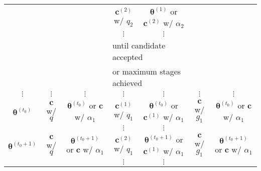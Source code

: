 \begin{sidewaystable}[h]
\begin{tabular}{|c||c|c||c|c||c|c|}
\cline{4-5}
                     &                         &                                         & $\mathbf{c}^{(2)}$ w/ $q_2$     & $\boldsymbol{\theta}^{(1)}$ or $\mathbf{c}^{(2)}$ w/ $\alpha_2$       &                  &                                         \\
\cline{4-5}
                     &                         &                                         & $\vdots$               & $\vdots$                                        &                  &                                         \\
\cline{4-5}
                     &                         &                                         & \multicolumn{2}{l||}{until candidate accepted}                           &                  &                                         \\
                     &                         &                                         & \multicolumn{2}{l||}{or maximum stages achieved}                         &                  &                                         \\
\hline
\hline
$\vdots$             & $\vdots$                & $\vdots$                                & $\vdots$               & $\vdots$                                        & $\vdots$         & $\vdots$                                \\
\hline
\hline
$\boldsymbol{\theta}^{(t_0)}$     & $\mathbf{c}$ w/ $q$              & $\boldsymbol{\theta}^{(t_0)}$ or $\mathbf{c}$ w/ $\alpha_1$     & $\mathbf{c}^{(1)}$ w/ $q_1$     & $\boldsymbol{\theta}^{(t_0)}$ or $\mathbf{c}^{(1)}$ w/ $\alpha_1$     & $\mathbf{c}$ w/ $g_1$     & $\boldsymbol{\theta}^{(t_0)}$ or $\mathbf{c}$ w/ $\alpha_1$     \\
\cline{4-5}
                     &                         &                                         & $\vdots$               & $\vdots$                                        &                  &                                         \\
\hline
\hline
$\boldsymbol{\theta}^{(t_0+1)}$   & $\mathbf{c}$ w/ $q$              & $\boldsymbol{\theta}^{(t_0+1)}$ or $\mathbf{c}$ w/ $\alpha_1$   & $\mathbf{c}^{(2)}$ w/ $q_1$     & $\boldsymbol{\theta}^{(t_0+1)}$ or $\mathbf{c}^{(1)}$ w/ $\alpha_1$   & $\mathbf{c}$ w/ $g_1$     & $\boldsymbol{\theta}^{(t_0+1)}$ or $\mathbf{c}$ w/ $\alpha_1$   \\
\cline{4-5}
                     &                         &                                         & $\vdots$               & $\vdots$                                        &                  &                                         \\

\end{tabular}
\end{sidewaystable}
